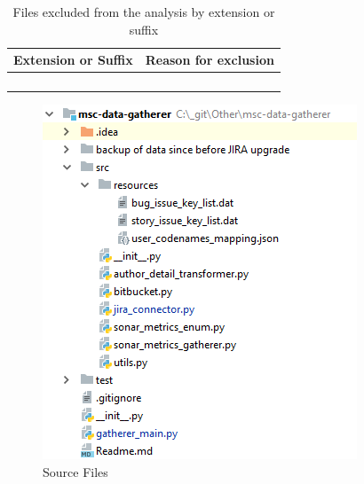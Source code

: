 \begin{table}[h!]
\centering
\caption{Files excluded from the analysis by extension or suffix}
\label{tbl:file-extensions-excluded-from-analysis}
\begin{tabular}{@{}ll@{}}
\toprule
Extension or Suffix & Reason for exclusion \\ \midrule
 &  \\
 &  \\
 &  \\
 &  \\ \bottomrule
\end{tabular}
\end{table}

\begin{figure}[!h]
    \centering
    \includegraphics{Figures/impl_src_folder_files.png}
    \caption{Source Files}
    \label{fig:impl-data-gatherer-source-files}
\end{figure}


